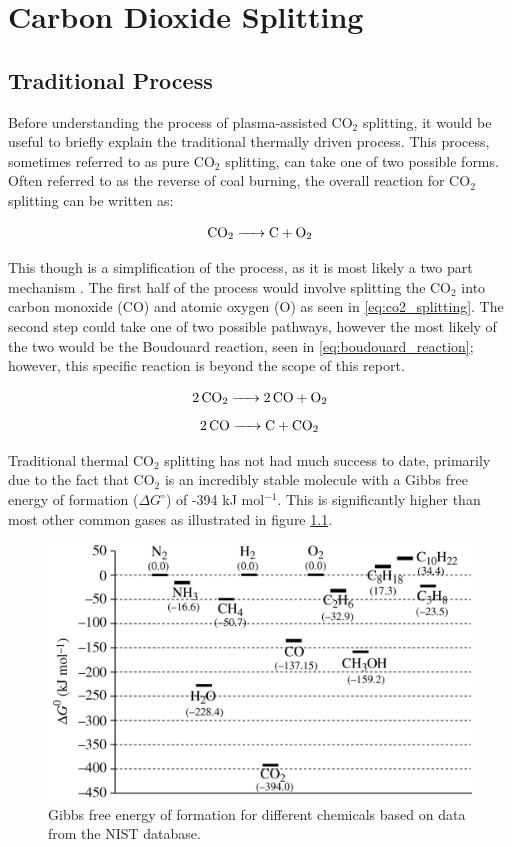 \chapter{Carbon Dioxide Splitting}

\section{Traditional Process}

Before understanding the process of plasma-assisted CO$_2$ splitting, it would be useful to briefly explain the traditional thermally driven process. This process, sometimes referred to as pure CO$_2$ splitting, can take one of two possible forms. Often referred to as the reverse of coal burning, the overall reaction for CO$_2$ splitting can be written as:

\begin{equation}
    \ce{CO_2 -> C + O_2}
\end{equation}

This though is a simplification of the process, as it is most likely a two part mechanism \cite{rayne_2008}. The first half of the process would involve splitting the CO$_2$ into carbon monoxide (CO) and atomic oxygen (O) as seen in \ref{eq:co2_splitting}. The second step could take one of two possible pathways, however the most likely of the two would be the Boudouard reaction, seen in \ref{eq:boudouard_reaction}; however, this specific reaction is beyond the scope of this report.

\begin{equation}
    \ce{2CO_2 -> 2CO + O_2}
    \label{eq:co2_splitting}
\end{equation}
\begin{equation}
    \ce{2CO -> C + CO_2}
    \label{eq:boudouard_reaction}
\end{equation}

Traditional thermal CO$_2$ splitting has not had much success to date, primarily due to the fact that CO$_2$ is an incredibly stable molecule with a Gibbs free energy of formation ($\Delta G^\circ$) of -394 kJ mol$^{-1}$. This is significantly higher than most other common gases as illustrated in figure \ref{fig:co2_stability}. 

\begin{figure}[h!]
	\centering
	\includegraphics[width=0.6\linewidth]{chapter_3/figures/co2_stability.jpg}
	\caption{Gibbs free energy of formation for different chemicals based on data from the NIST database. \cite{jiang_xiao_kuznetsov_edwards_2010}}
	\label{fig:co2_stability}
\end{figure} 

